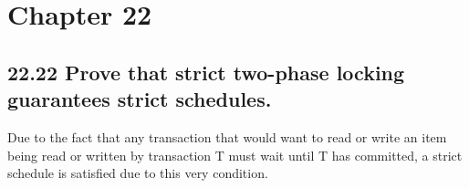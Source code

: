 \section*{Chapter 22}

\subsection*{22.22 Prove that strict two-phase locking guarantees strict schedules.}
Due to the fact that any transaction that would want to read or write an item being read or written by transaction T must wait until T has committed, a strict schedule is satisfied due to this very condition.